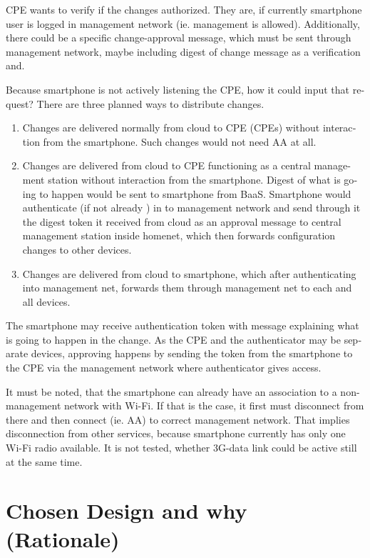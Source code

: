 \documentclass[12pt,a4paper,english]{tutthesis}
\begin{document}
\begin{otherlanguage}{english}
CPE wants to verify if the changes authorized. They are, if currently
smartphone user is logged in management network (ie. management is allowed).
Additionally, there could be a  specific change-approval message,
which must be sent through  management network, maybe
including digest of change message as a verification and.

Because smartphone is not actively listening the CPE, how it could
input that request? 
There are three planned ways to distribute changes.

\begin{enumerate}
\item Changes are delivered normally from cloud to CPE (CPEs) without
interaction  from the smartphone. Such changes would not need
AA at all.

\item Changes are delivered from cloud to CPE functioning as a central
management station without interaction from the smartphone. 
Digest of what is going to happen would be sent to smartphone from
BaaS. Smartphone would authenticate (if not already ) in to
management network and send through it the digest token it received from cloud 
as an approval message to central management station
inside homenet, which then forwards configuration changes to other devices.

\item Changes are delivered from cloud to smartphone, which after
authenticating into management net, forwards them through management
net to each and all devices.
\end{enumerate}


The smartphone may receive authentication token with 
message explaining what is going to happen in the change.
As the CPE and the authenticator may be separate devices, approving
happens by sending the token from the smartphone to the CPE via the
management network where authenticator gives access.

It must be noted, that the smartphone can already have an association
to a non-management network with Wi-Fi. If that is the case, it first
must disconnect from there and then connect (ie. AA) to correct management
network. That implies disconnection from other services, because 
smartphone currently has only one Wi-Fi radio available. 
It is not tested, whether 3G-data link could be active still at the
same time.



\section{Chosen Design and why (Rationale)}
\label{sec-4-3}


\end{otherlanguage}
\end{document}
